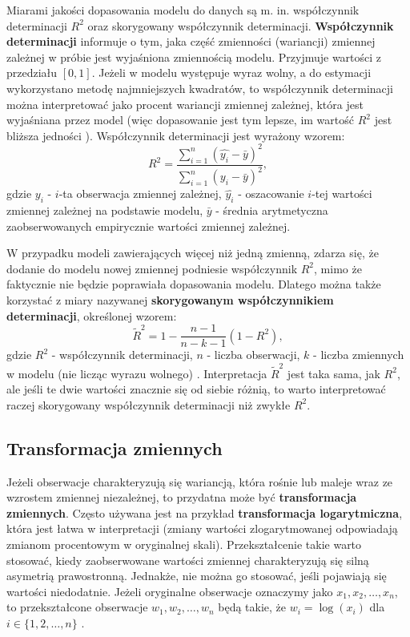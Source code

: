 \documentclass[12pt]{mwbk}
\theoremstyle{plain}
\theoremstyle{definition}
\theoremstyle{definition}
\begin{document}
Miarami jakości dopasowania modelu do danych są m. in. współczynnik determinacji $R^2$ oraz skorygowany współczynnik determinacji. \textbf{Współczynnik determinacji} informuje o tym, jaka część zmienności (wariancji) zmiennej zależnej w próbie jest wyjaśniona zmiennością modelu. Przyjmuje wartości z przedziału $[0,1]$. Jeżeli w modelu występuje wyraz wolny, a do estymacji wykorzystano metodę najmniejszych kwadratów, to współczynnik determinacji można interpretować jako procent wariancji zmiennej zależnej, która jest wyjaśniana przez model (więc dopasowanie jest tym lepsze, im wartość $R^2$ jest bliższa jedności \cite{r2}). Współczynnik determinacji jest wyrażony wzorem:
$$R^2=\frac{\sum\limits_{i=1}^{n}(\hat{y_i}-\bar{y})^2}{\sum\limits_{i=1}^{n}(y_i-\bar{y})^2},$$ gdzie $y_i$ - $i$-ta obserwacja zmiennej zależnej, $\hat{y_i}$ - oszacowanie $i$-tej wartości zmiennej zależnej na podstawie modelu, $\bar{y}$ - średnia arytmetyczna zaobserwowanych empirycznie wartości zmiennej zależnej.

W przypadku modeli zawierających więcej niż jedną zmienną, zdarza się, że dodanie do modelu nowej zmiennej podniesie współczynnik $R^2$, mimo że faktycznie nie będzie poprawiała dopasowania modelu. Dlatego można także korzystać z miary nazywanej \textbf{skorygowanym współczynnikiem determinacji}, określonej wzorem:
$$\tilde{R}^2=1-\frac{n-1}{n-k-1}(1-R^2),$$
gdzie $R^2$ - współczynnik determinacji, $n$ - liczba obserwacji, $k$ - liczba zmiennych w modelu (nie licząc wyrazu wolnego) \cite{skorygowany}. Interpretacja $\tilde{R}^2$ jest taka sama, jak $R^2$, ale jeśli te dwie wartości znacznie się od siebie różnią, to warto interpretować raczej skorygowany współczynnik determinacji niż zwykłe $R^2$.

\subsection{Transformacja zmiennych}

Jeżeli obserwacje charakteryzują się wariancją, która rośnie lub maleje wraz ze wzrostem zmiennej niezależnej, to przydatna może być \textbf{transformacja zmiennych}. Często używana jest na przykład \textbf{transformacja logarytmiczna}, która jest łatwa w interpretacji (zmiany wartości zlogarytmowanej odpowiadają zmianom procentowym w oryginalnej skali). Przekształcenie takie warto stosować, kiedy zaobserwowane wartości zmiennej charakteryzują się silną asymetrią prawostronną. Jednakże, nie można go stosować, jeśli pojawiają się wartości niedodatnie. Jeżeli oryginalne obserwacje oznaczymy jako $x_1, x_2,\ldots, x_n$, to przekształcone obserwacje $w_1, w_2,\ldots,w_n$ będą takie, że $w_i=\log(x_i)$ dla $i \in \lbrace{1,2,\ldots,n\rbrace}$ \cite{forecasting}.
\end{document}
